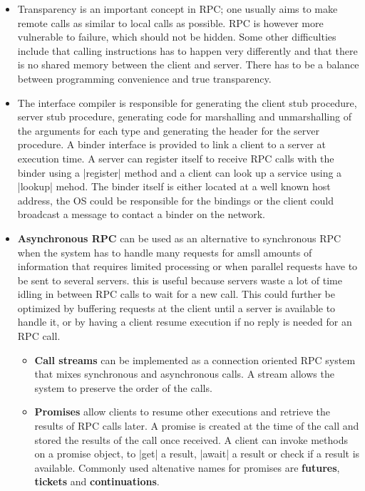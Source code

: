 \documentclass[a4paper]{article}
\begin{document}
\begin{itemize}
\begin{enumerate}
\end{enumerate}
\item Transparency is an important concept in RPC; one usually aims to make remote calls as similar to local calls as possible. RPC is however more vulnerable to failure, which should not be hidden. Some other difficulties include that calling instructions has to happen very differently and that there is no shared memory between the client and server. There has to be a balance between programming convenience and true transparency.
\item The interface compiler is responsible for generating the client stub procedure, server stub procedure, generating code for marshalling and unmarshalling of the arguments for each type and generating the header for the server procedure. A binder interface is provided to link a client to a server at execution time. A server can register itself to receive RPC calls with the binder using a |register| method and a client can look up a service using a |lookup| mehod. The binder itself is either located at a well known host address, the OS could be responsible for the bindings or the client could broadcast a message to contact a binder on the network.
\item \textbf{Asynchronous RPC} can be used as an alternative to synchronous RPC when the system has to handle many requests for amsll amounts of information that requires limited processing or when parallel requests have to be sent to several servers. this is useful because servers waste a lot of time idling in between RPC calls to wait for a new call. This could further be optimized by buffering requests at the client until a server is available to handle it, or by having a client resume execution if no reply is needed for an RPC call.
\begin{itemize}
\item \textbf{Call streams} can be implemented as a connection oriented RPC system that mixes synchronous and asynchronous calls. A stream allows the system to preserve the order of the calls.
\item \textbf{Promises} allow clients to resume other executions and retrieve the results of RPC calls later. A promise is created at the time of the call and stored the results of the call once received. A client can invoke methods on a promise object, to |get| a result, |await| a result or check if a result is available. Commonly used altenative names for promises are \textbf{futures}, \textbf{tickets} and \textbf{continuations}.
\end{itemize}
\end{itemize}
\end{document}
